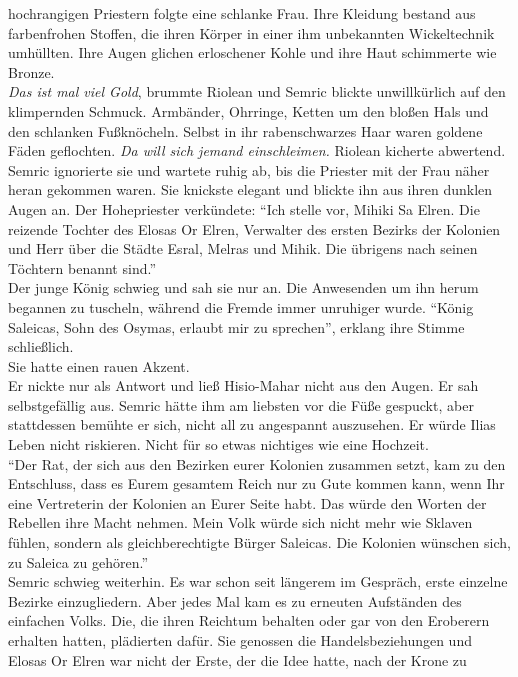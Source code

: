 hochrangigen Priestern folgte eine schlanke Frau. Ihre Kleidung bestand aus farbenfrohen Stoffen, 
die ihren Körper in einer ihm unbekannten Wickeltechnik umhüllten. Ihre Augen glichen erloschener 
Kohle und ihre Haut schimmerte wie Bronze.\\
\textit{Das ist mal viel Gold}, brummte Riolean und Semric blickte unwillkürlich auf den 
klimpernden Schmuck. Armbänder, Ohrringe, Ketten um den bloßen Hals und den schlanken Fußknöcheln. 
Selbst in ihr rabenschwarzes Haar waren goldene Fäden geflochten. \textit{Da will sich jemand 
einschleimen.} Riolean kicherte abwertend.\\
Semric ignorierte sie und wartete ruhig ab, bis die Priester mit der Frau näher heran gekommen 
waren. Sie knickste elegant und blickte ihn aus ihren dunklen Augen an. Der Hohepriester 
verkündete: ``Ich stelle vor, Mihiki Sa Elren. Die reizende Tochter des Elosas Or Elren, Verwalter 
des ersten Bezirks der Kolonien und Herr über die Städte Esral, Melras und Mihik. Die übrigens nach 
seinen Töchtern benannt sind.''\\
Der junge König schwieg und sah sie nur an. Die Anwesenden um ihn herum begannen zu tuscheln, 
während die Fremde immer unruhiger wurde.
``König Saleicas, Sohn des Osymas, erlaubt mir zu sprechen'', erklang ihre Stimme schließlich.\\
Sie hatte einen rauen Akzent.\\
Er nickte nur als Antwort und ließ Hisio-Mahar nicht aus den Augen. Er sah selbstgefällig aus. 
Semric hätte ihm am liebsten vor die Füße gespuckt, aber stattdessen bemühte er sich, nicht all zu 
angespannt auszusehen. Er würde Ilias Leben nicht riskieren. Nicht für so etwas nichtiges wie eine 
Hochzeit.\\
``Der Rat, der sich aus den Bezirken eurer Kolonien zusammen setzt, kam zu den Entschluss, dass es 
Eurem gesamtem Reich nur zu Gute kommen kann, wenn Ihr eine Vertreterin der Kolonien an Eurer Seite 
habt. Das würde den Worten der Rebellen ihre Macht nehmen. Mein Volk würde sich nicht mehr wie 
Sklaven fühlen, sondern als gleichberechtigte Bürger Saleicas. Die Kolonien wünschen sich, zu 
Saleica zu gehören.''\\
Semric schwieg weiterhin. Es war schon seit längerem im Gespräch, erste einzelne Bezirke 
einzugliedern. Aber jedes Mal kam es zu erneuten Aufständen des einfachen Volks. Die, die ihren 
Reichtum behalten oder gar von den Eroberern erhalten hatten, plädierten dafür. Sie genossen die 
Handelsbeziehungen und Elosas Or Elren war nicht der Erste, der die Idee hatte, nach der Krone zu 

